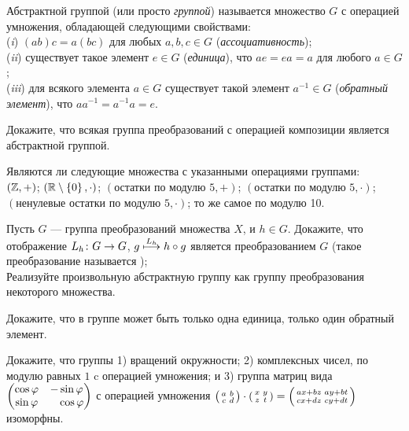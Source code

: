 \documentclass[a4paper,12pt]{article}
\begin{document}


 Абстрактной  группой (или просто \emph{группой}) называется множество $G$ с операцией умножения, обладающей следующими свойствами:\\
(\emph{i}\/) $(ab)c = a(bc)$ для любых $a,b,c\in G$ (\emph{ассоциативность});\\
(\emph{ii}\/) существует такое элемент $e\in G$ (\emph{единица}), что $ae=ea=a$ для любого $a\in G$;\\
(\emph{iii}\/) для всякого элемента $a\in G$ существует такой элемент $a^{-1}\in G$ (\emph{обратный элемент}), что $a a^{-1} = a^{-1} a = e$.

Докажите, что всякая группа преобразований с операцией композиции является абстрактной группой.

\label{gr}
Являются ли  следующие множества с указанными операциями группами:\\
 $(\mathbb{Z}, + )$;  $(\mathbb{R}\setminus \left\{0\right\}, \cdot)$;  $(\text{остатки по модулю }5, +)$;  $(\text{остатки по модулю }5, \cdot)$;\\  $(\text{ненулевые остатки по модулю }5, \cdot)$;  то же самое по модулю 10.

Пусть $G$ --- группа преобразований множества $X$, и $h\in G$.
Докажите, что отображение $L_h \colon G \rightarrow G$, $g\stackrel{L_h}{\longmapsto} h\circ g$ является преобразованием $G$ (такое преобразование называется );\\
Реализуйте произвольную абстрактную группу как группу преобразования некоторого множества.


Докажите, что в группе может быть только одна единица, только один обратный элемент.

Докажите, что группы 1) вращений окружности; 2) комплексных чисел, по модулю равных $1$ c операцией умножения; и 3) группа матриц вида $\begin{pmatrix}\cos \varphi & - \sin \varphi\\\sin \varphi &\phantom{-}\cos\varphi\end{pmatrix}$ с операцией умножения $\left(\begin{smallmatrix}a&b\\c&d\end{smallmatrix}\right)\cdot\left(\begin{smallmatrix}x&y\\z&t\end{smallmatrix}\right)=
\left(\begin{smallmatrix}ax+bz&ay+bt\\cx+dz&cy+dt\end{smallmatrix}\right)$ изоморфны.


\end{document}
